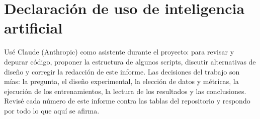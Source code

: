 \section*{Declaración de uso de inteligencia artificial}
{\small
Usé Claude (Anthropic) como asistente durante el proyecto: para revisar y depurar código, proponer la estructura de algunos scripts, discutir alternativas de diseño y corregir la redacción de este informe. Las decisiones del trabajo son mías: la pregunta, el diseño experimental, la elección de datos y métricas, la ejecución de los entrenamientos, la lectura de los resultados y las conclusiones. Revisé cada número de este informe contra las tablas del repositorio y respondo por todo lo que aquí se afirma.\par}
